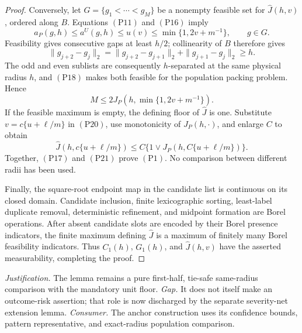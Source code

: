 \documentclass{article}
\begin{document}
\begin{proof}
Conversely, let \(G=\{g_1<\cdots<g_M\}\) be a nonempty feasible set for
\(\widehat J(h,v)\), ordered along \(B\).  Equations \((\mathrm{P11})\)
and \((\mathrm{P16})\) imply
\[
 a_P(g,h)\leq a^U(g,h)\leq u(v)
 \leq\min\{1,2v+m^{-1}\},\qquad g\in G.
 \tag{P18}
\]
Feasibility gives consecutive gaps at least \(h/2\); collinearity of
\(B\) therefore gives
\[
 \|g_{j+2}-g_j\|_2
 =\|g_{j+2}-g_{j+1}\|_2+\|g_{j+1}-g_j\|_2\geq h.
 \tag{P19}
\]
The odd and even sublists are consequently \(h\)-separated at the same
physical radius \(h\), and \((\mathrm{P18})\) makes both feasible for the
population packing problem.  Hence
\[
 M\leq2J_P(h,\min\{1,2v+m^{-1}\}).
 \tag{P20}
\]
If the feasible maximum is empty, the defining floor of \(\widehat J\) is
one.  Substitute \(v=c\{u+\ell/m\}\) in \((\mathrm{P20})\), use monotonicity
of \(J_P(h,\cdot)\), and enlarge \(C\) to obtain
\[
 \widehat J(h,c\{u+\ell/m\})
 \leq C\{1\vee J_P(h,C\{u+\ell/m\})\}.
 \tag{P21}
\]
Together, \((\mathrm{P17})\) and \((\mathrm{P21})\) prove \((\mathrm{P1})\).
No comparison between different radii has been used.

Finally, the square-root endpoint map in the candidate list is continuous
on its closed domain.  Candidate inclusion, finite lexicographic sorting,
least-label duplicate removal, deterministic refinement, and midpoint
formation are Borel operations.  After absent candidate slots are encoded
by their Borel presence indicators, the finite maximum defining
\(\widehat J\) is a maximum of finitely many Borel feasibility indicators.
Thus \(C_1(h)\), \(G_1(h)\), and \(\widehat J(h,v)\) have the asserted
measurability, completing the proof.
\end{proof}
\par\smallskip\noindent \textit{Justification.} The lemma remains a pure first-half, tie-safe same-radius comparison with the mandatory unit floor. \textit{Gap.} It does not itself make an outcome-risk assertion; that role is now discharged by the separate severity-net extension lemma. \textit{Consumer.} The anchor construction uses its confidence bounds, pattern representative, and exact-radius population comparison.
\end{document}
